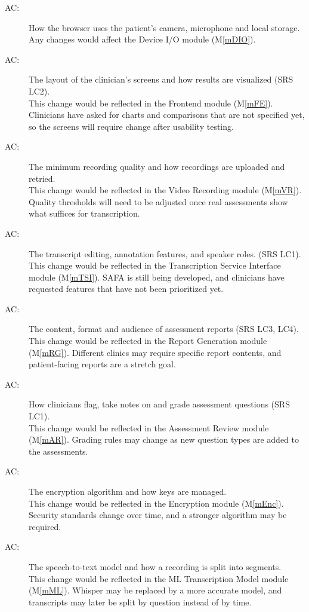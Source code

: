 \documentclass[12pt, titlepage]{article}
\newcounter{acnum}
\newcommand{\actheacnum}{AC\theacnum}
\newcommand{\mref}[1]{M\ref{#1}}
\begin{document}
\begin{description}
\item[ \actheacnum \label{acHardware}:] 
How the browser uses the patient's camera, microphone and local storage.\\
Any changes would affect the Device I/O module (\mref{mDIO}).
\item[ \actheacnum \label{acUI}:] The layout of the clinician's screens 
and how results are visualized (SRS LC2).\\
This change would be reflected in the Frontend module (\mref{mFE}). 
Clinicians have asked for charts and comparisons that are not specified yet, 
so the screens will require change after usability testing.
\item[ \actheacnum \label{acRecording}:] The minimum recording quality 
and how recordings are uploaded and retried.\\
This change would be reflected in the Video Recording module (\mref{mVR}). 
Quality thresholds will need to be adjusted once real assessments show what suffices for transcription.
\item[ \actheacnum \label{acTranscript}:] The transcript editing, annotation 
features, and speaker roles. (SRS LC1).\\
This change would be reflected in the Transcription Service Interface module (\mref{mTSI}). 
SAFA is still being developed, and clinicians have requested features that have not been prioritized yet.
\item[ \actheacnum \label{acReport}:] The content, format and audience of assessment reports (SRS LC3, LC4).\\
This change would be reflected in the Report Generation module (\mref{mRG}). Different clinics may require specific report contents, and patient-facing reports are a stretch goal.
\item[ \actheacnum \label{acReview}:] How clinicians flag, take notes on and grade assessment questions (SRS LC1).\\
This change would be reflected in the Assessment Review module (\mref{mAR}). Grading rules may change as new question types are added to the assessments.
\item[ \actheacnum \label{acEncryption}:] The encryption algorithm and how keys are managed.\\
This change would be reflected in the Encryption module (\mref{mEnc}). Security standards change over time, and a stronger algorithm may be required.
\item[ \actheacnum \label{acModel}:] The speech-to-text model and how a recording is split into segments.\\
This change would be reflected in the ML Transcription Model module (\mref{mML}). Whisper may be replaced by a more accurate model, and transcripts may later be split by question instead of by time.
\end{description}
\end{document}
